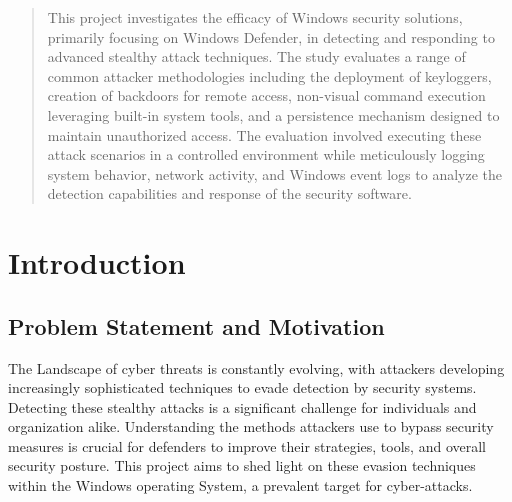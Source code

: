 \documentclass[11pt]{article}
\begin{document}
		\justifying
		
		\tableofcontents
		\newpage
		\listoffigures
		\newpage
		
		\begin{abstract}
		This project investigates the efficacy of Windows security solutions, primarily focusing on Windows Defender, in detecting and responding to advanced stealthy attack techniques. The study evaluates a range of common attacker methodologies including the deployment of keyloggers, creation of backdoors for remote access, non-visual command execution leveraging built-in system tools, and a persistence mechanism designed to maintain unauthorized access. The evaluation involved executing these attack scenarios in a controlled environment while meticulously logging system behavior, network activity, and Windows event logs to analyze the detection capabilities and response of the security software.
		\end{abstract}
		
		\newpage
		\section{Introduction}
		\subsection{Problem Statement and Motivation}
		The Landscape of cyber threats is constantly evolving, with attackers developing increasingly sophisticated techniques to evade detection by security systems. Detecting these stealthy attacks is a significant challenge for individuals and organization alike. Understanding the methods attackers use to bypass security measures is crucial for defenders to improve their strategies, tools, and overall security posture. This project aims to shed light on these evasion techniques within the Windows operating System, a prevalent target for cyber-attacks.
\end{document}
